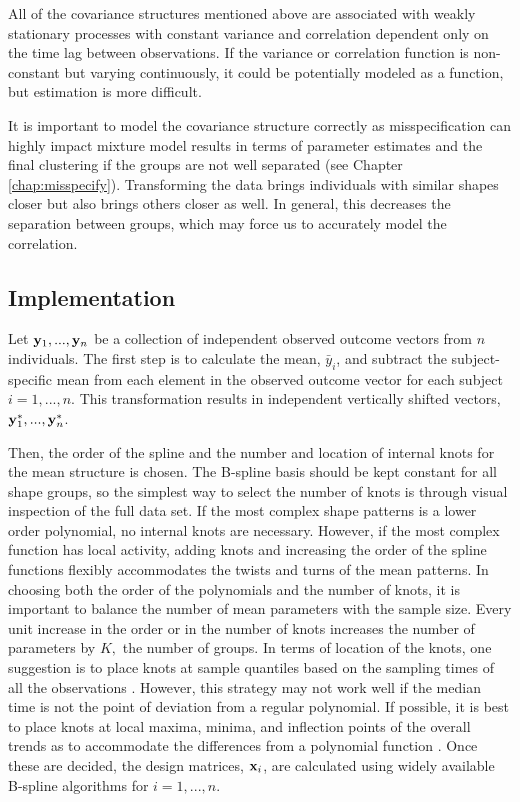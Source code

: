 All of the covariance structures mentioned above are associated with weakly stationary processes with constant variance and correlation dependent only on the time lag between observations. If the variance or correlation function is non-constant but varying continuously, it could be potentially modeled as a function, but estimation is more difficult.

It is important to model the covariance structure correctly as misspecification can highly impact mixture model results in terms of parameter estimates and the final clustering if the groups are not well separated (see Chapter \ref{chap:misspecify}). Transforming the data brings individuals with similar shapes closer but also brings others closer as well. In general, this decreases the separation between groups, which may force us to accurately model the correlation. 

\subsection{Implementation}
Let $\mathbf y_{1},...,\mathbf y_{n}$ be a collection of independent observed outcome vectors from $n$ individuals. The first step is to calculate the mean, $\bar{y}_{i}$, and subtract the subject-specific mean from each element in the observed outcome vector for each subject $i=1,...,n$. This transformation results in independent vertically shifted vectors, $\mathbf y^{*}_{1},...,\mathbf y^{*}_{n}$.  

Then, the order of the spline and the number and location of internal knots for the mean structure is chosen. The B-spline basis should be kept constant for all shape groups, so the simplest way to select the number of knots is through visual inspection of the full data set. If the most complex shape patterns is a lower order polynomial, no internal knots are necessary. However, if the most complex function has local activity, adding knots and increasing the order of the spline functions flexibly accommodates the twists and turns of the mean patterns. In choosing both the order of the polynomials and the number of knots, it is important to balance the number of mean parameters with the sample size. Every unit increase in the order or in the number of knots increases the number of parameters by $K,$ the number of groups. In terms of location of the knots, one suggestion is to place knots at sample quantiles based on the sampling times of all the observations \cite{ruppert2002}. However, this strategy may not work well if the median time is not the point of deviation from a regular polynomial. If possible, it is best to place knots at local maxima, minima, and inflection points of the overall trends as to accommodate the differences from a polynomial function \cite{eubank1999}.  Once these are decided, the design matrices, $\mathbf x_{i}$, are calculated using widely available B-spline algorithms for $i=1,...,n$. 


